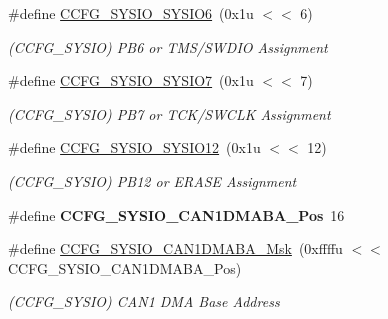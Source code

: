 \begin{DoxyCompactItemize}
\mbox{\label{group__SAME70__MATRIX_ga2ed6a8e8801f4a9f5751e5cdaa6a7615}} 
\#define \mbox{\hyperlink{group__SAME70__MATRIX_ga2ed6a8e8801f4a9f5751e5cdaa6a7615}{C\+C\+F\+G\+\_\+\+S\+Y\+S\+I\+O\+\_\+\+S\+Y\+S\+I\+O6}}~(0x1u $<$$<$ 6)
\begin{DoxyCompactList}\small\item\em (C\+C\+F\+G\+\_\+\+S\+Y\+S\+IO) P\+B6 or T\+M\+S/\+S\+W\+D\+IO Assignment \end{DoxyCompactList}\item 
\mbox{\label{group__SAME70__MATRIX_ga28b95aaca8e016fcacd6042b589a1084}} 
\#define \mbox{\hyperlink{group__SAME70__MATRIX_ga28b95aaca8e016fcacd6042b589a1084}{C\+C\+F\+G\+\_\+\+S\+Y\+S\+I\+O\+\_\+\+S\+Y\+S\+I\+O7}}~(0x1u $<$$<$ 7)
\begin{DoxyCompactList}\small\item\em (C\+C\+F\+G\+\_\+\+S\+Y\+S\+IO) P\+B7 or T\+C\+K/\+S\+W\+C\+LK Assignment \end{DoxyCompactList}\item 
\mbox{\label{group__SAME70__MATRIX_ga9e6590c0ddc9425df1a4eefaf2b041e4}} 
\#define \mbox{\hyperlink{group__SAME70__MATRIX_ga9e6590c0ddc9425df1a4eefaf2b041e4}{C\+C\+F\+G\+\_\+\+S\+Y\+S\+I\+O\+\_\+\+S\+Y\+S\+I\+O12}}~(0x1u $<$$<$ 12)
\begin{DoxyCompactList}\small\item\em (C\+C\+F\+G\+\_\+\+S\+Y\+S\+IO) P\+B12 or E\+R\+A\+SE Assignment \end{DoxyCompactList}\item 
\mbox{\label{group__SAME70__MATRIX_ga3180860a8702ffd3cab1734847d0c051}} 
\#define {\bfseries C\+C\+F\+G\+\_\+\+S\+Y\+S\+I\+O\+\_\+\+C\+A\+N1\+D\+M\+A\+B\+A\+\_\+\+Pos}~16
\item 
\mbox{\label{group__SAME70__MATRIX_ga2c89fbda7d21b335d5be42d5dd6c6ce7}} 
\#define \mbox{\hyperlink{group__SAME70__MATRIX_ga2c89fbda7d21b335d5be42d5dd6c6ce7}{C\+C\+F\+G\+\_\+\+S\+Y\+S\+I\+O\+\_\+\+C\+A\+N1\+D\+M\+A\+B\+A\+\_\+\+Msk}}~(0xffffu $<$$<$ C\+C\+F\+G\+\_\+\+S\+Y\+S\+I\+O\+\_\+\+C\+A\+N1\+D\+M\+A\+B\+A\+\_\+\+Pos)
\begin{DoxyCompactList}\small\item\em (C\+C\+F\+G\+\_\+\+S\+Y\+S\+IO) C\+A\+N1 D\+MA Base Address \end{DoxyCompactList}\item 

\end{DoxyCompactItemize}
